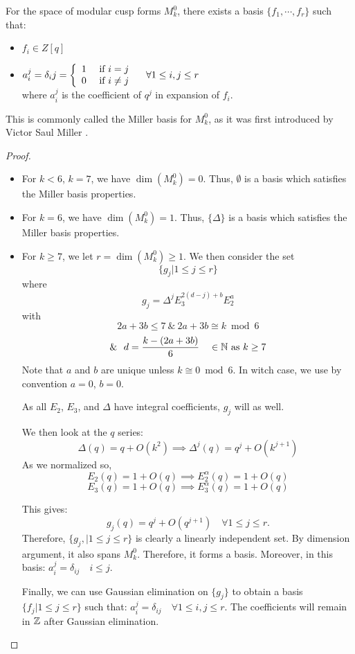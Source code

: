 \begin{theorem}
	For the space of modular cusp forms $M_k^0$, there exists a basis $\{f_1, \cdots, f_r\}$ such that:
	\begin{itemize}
		\item $f_i \in Z[q]$
		\item $ a_i^j = \delta_ij = 
		\left\lbrace
		\begin{array}{l l}
			1 & \text{ if } i   =  j \\
			0 & \text{ if } i \neq j
		\end{array}
		\right. \quad
		\forall 1 \leq i,j \leq r$\\
		where $a_i^j$ is the coefficient of $q^j$ in expansion of $f_i$.
	\end{itemize}
\end{theorem}
This is commonly called the Miller basis for $M_k^0$, as it was first introduced by Victor Saul Miller \cite{MillerThesis}.
\begin{proof}
	\begin{itemize}
		\item For $k<6$, $k=7$, we have $\dim(M_k^0)=0$.
		Thus, $\emptyset$ is a basis which satisfies the Miller basis properties.
		
		\item For $k=6$, we have $\dim(M_k^0)=1$.
		Thus, $\{ \Delta \}$ is a basis which satisfies the Miller basis properties.
		
		\item For $k \geq 7$, we let $r = \dim(M_k^0) \geq 1$.	
		We then consider the set
		$$
		\{ g_j | 1 \leq j \leq r \}
		$$
		where
		$$
		g_j = \Delta^jE_3^{2(d-j)+b}E_2^a
		$$
		with
		$$
		2a+3b \leq 7 \ \&\ 2a+3b \cong k \bmod 6$$
		$$
		\& \ \ d=\frac{k-(2a+3b)}{6} \quad \in \mathbb{N} \text{ as $k \geq 7$}
		$$
		Note that $a$ and $b$ are unique unless $k \cong 0 \bmod 6$. In witch case, we use by convention $a=0$, $b=0$.
		
		As all $E_2$, $E_3$, and $\Delta$ have integral coefficients, $g_j$ will as well.
		
		We then look at the $q$ series:
		$$
		\Delta(q) = q + O(k^2) \implies \Delta^j(q) = q^j + O(k^{j+1})
		$$
		As we normalized so,
		$$
		E_2(q) = 1 + O(q) \implies E_2^{\alpha}(q) = 1 + O(q)
		$$
		$$
		E_3(q) = 1 + O(q) \implies E_3^{\alpha}(q) = 1 + O(q)
		$$
		
		This gives:
		$$
		g_j(q) = q^j + O(q^{j+1}) \quad \forall 1 \leq j \leq r.
		$$
		Therefore, $\{ g_j, | 1 \leq j \leq r \}$ is clearly a linearly independent set. By dimension argument, it also spans $M_k^0$. Therefore, it forms a basis.
		Moreover, in this basis: $a_i^j = \delta_{ij} \quad i \leq j$.
		
		Finally, we can use Gaussian elimination on $\{g_j\}$ to obtain a basis $\{f_j | 1 \leq j \leq r \}$ such that: $a_i^j = \delta_{ij} \quad \forall 1 \leq i,j \leq r$.
		The coefficients will remain in $\mathbb{Z}$ after Gaussian elimination.
	\end{itemize}
\end{proof}

